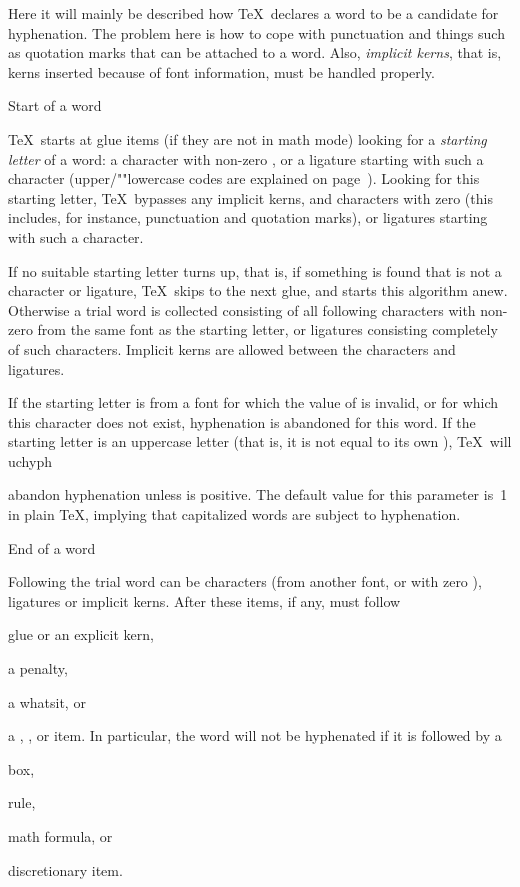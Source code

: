 Here it will mainly be described how \TeX\ declares a word to
be a candidate for hyphenation. The  problem here is
how to cope with punctuation and things such as quotation marks
that can be attached to a word. Also, {\em implicit kerns\/},
that is, kerns inserted because of font information,
must  be handled properly.

\spoint Start of a word

\TeX\ starts at glue items (if they are not in math mode)
looking for a {\em starting letter\/} of a word:
a character with non-zero , or a ligature starting
with such a character (upper/""lowercase codes are explained
on page~\pgref[uc/lc]).
Looking for this starting letter,
\TeX\ bypasses any implicit kerns, and
characters with zero  (this includes,
for instance, punctuation and quotation marks), 
or ligatures starting with
such a character.

If no suitable starting letter turns up, that is, if
something is found that is not a character or ligature,
\TeX\ skips to the next glue, and starts this algorithm anew.
Otherwise a trial word is collected consisting of
all following characters with non-zero 
from the same font as the starting letter, or ligatures consisting
completely of such characters. Implicit kerns are allowed
between the characters and ligatures.

If the starting letter is from a font for which the value
of  is invalid, or for which this character
does not exist, hyphenation is abandoned for this word.
If the starting letter is an uppercase letter (that is,
it is not equal to its own ), \TeX\ will
\csterm uchyph\par
abandon hyphenation unless  is positive.
The default value for this parameter is~1  in
plain \TeX,
implying that capitalized words are subject to hyphenation.

\spoint End of a word


Following the trial word can be characters (from another
font, or with zero ), ligatures or implicit kerns.
After these items, if any, must follow
\itemlist\item glue or an explicit kern,
\item a penalty,
\item a whatsit, or
\item a , , or  item.
\itemliststop
In particular, the word will not be hyphenated if it is
followed by a \itemlist\item box, \item rule, \item math
formula, or \item discretionary item.\itemliststop

